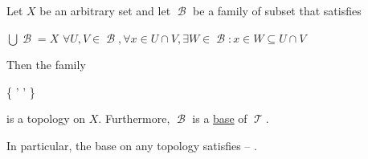 \begin{proposition}\label{thm:topological_base_axioms}\mcite\cite[12]{Engelking1989}
  Let \( X \) be an arbitrary set and let \( \mscrB \) be a family of subset that satisfies
  \begin{thmenum}
     \( \bigcup \mscrB = X \)
     \( \forall U, V \in \mscrB, \forall x \in U \cap V, \exists W \in \mscrB: x \in W \subseteq U \cap V \)
  \end{thmenum}

  Then the family
  \begin{balign}\label{thm:topological_base_axioms/topology}
    \mscrT \coloneqq \left\{ \bigcup \mscrB' \colon \mscrB' \subseteq \mscrB \right\}
  \end{balign}
  is a topology on \( X \). Furthermore, \( \mscrB \) is a \hyperref[def:topological_base]{base} of \( \mscrT \).

  In particular, the base on any topology satisfies  -- .
\end{proposition}
